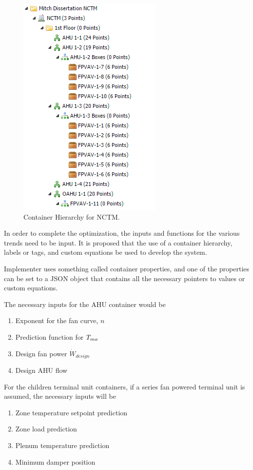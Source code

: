 \begin{figure}
\centering
\includegraphics{Images/ContainerHierarchy.PNG}
\caption{Container Hierarchy for NCTM.}
\label{fig:ContainerHierarchy}
\end{figure}

In order to complete the optimization, the inputs and functions for the
various trends need to be input. It is proposed that the use of a
container hierarchy, labels or tags, and custom equations be used to
develop the system.

Implementer uses something called container properties, and one of the
properties can be set to a JSON object that contains all the necessary
pointers to values or custom equations.

The necessary inputs for the AHU container would be 
\begin{enumerate}
    \item Exponent for the fan curve, \(n\)
    \item Prediction function for \(T_{ma}{}\) 
    \item Design fan power \(\dot{W}_{design}\)
    \item Design AHU flow 
\end{enumerate}
For the children terminal unit containers, if a series fan powered
terminal unit is assumed, the necessary inputs will be
\begin{enumerate}
    \item Zone temperature setpoint prediction
    \item Zone load prediction
    \item Plenum temperature prediction
    \item Minimum damper position
\end{enumerate}

